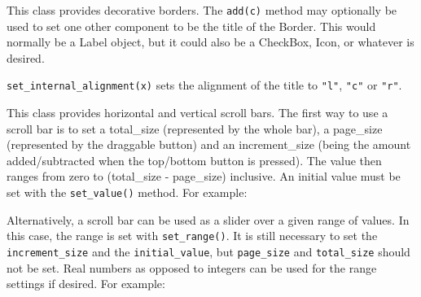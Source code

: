 
This class provides decorative borders. The \texttt{add(c)} method
may optionally be used to set one other
component to be the title of the Border. This would normally be a
Label object, but it could also be a CheckBox, Icon, or whatever is
desired.

\texttt{set\_internal\_alignment(x)} sets the alignment of the title
to \texttt{"l"}, \texttt{"c"} or \texttt{"r"}.



This class provides horizontal and vertical scroll bars.
The first way to use a scroll bar is to set a total\_size
(represented by the whole bar), a page\_size (represented by the
draggable button) and an increment\_size (being the amount
added/subtracted when the top/bottom button is pressed). The value
then ranges from zero to (total\_size - page\_size) inclusive. An
initial value must be set with the \texttt{set\_value()} method. For example:


Alternatively, a scroll bar can be used as a slider over a given range
of values. In this case, the range is set with \texttt{set\_range()}.
It is still necessary to set the \texttt{increment\_size} and the
\texttt{initial\_value}, but \texttt{page\_size} and
\texttt{total\_size} should not be set.
Real numbers as opposed to integers can be used for the range settings
if desired. For example:


